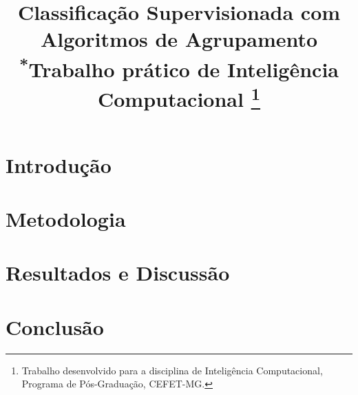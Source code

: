 \documentclass[conference]{IEEEtran}
\begin{document}
\title{Classificação Supervisionada com Algoritmos de Agrupamento\\
{\footnotesize \textsuperscript{*}Trabalho prático de Inteligência Computacional}
\thanks{Trabalho desenvolvido para a disciplina de Inteligência Computacional, Programa de Pós-Graduação, CEFET-MG.}
}

\author{
}

\maketitle

\renewcommand{\abstractname}{Resumo}
\begin{abstract}

\end{abstract}

\renewcommand{\IEEEkeywordsname}{Palavras-chave}
\begin{IEEEkeywords}

\end{IEEEkeywords}

\section{Introdução}


\section{Metodologia}




\section{Resultados e Discussão}


\section{Conclusão}


\renewcommand{\refname}{Referências}


\end{document}
